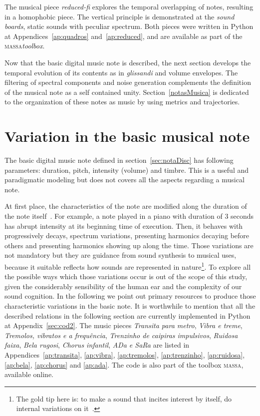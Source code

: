 \documentclass[
 aip,
 jmp,
 amsmath,amssymb,
 reprint,
]{revtex4-1}
\newcommand{\massa}{{\large \textsc{massa}}}
\begin{document}
The musical piece \emph{reduced-fi} explores the temporal overlapping of notes, resulting in a homophobic piece. The vertical principle is demonstrated at the \emph{sound boards}, static sounds with peculiar spectrum. Both pieces were written in Python at Appendices~\ref{ap:quadros} and~\ref{ap:reduced}, and are available as part of the \massa \emph{toolbox}.\cite{MASSA}

Now that the basic digital music note is described, the next section develops the temporal evolution of its contents as in \emph{glissandi} and volume envelopes. The filtering of spectral components and noise generation complements the definition of the musical note as a self contained unity. Section~\ref{notasMusica} is dedicated to the organization of these notes as music by using metrics and trajectories.



\section{Variation in the basic musical note}\label{sec:internalVar}

The basic digital music note defined in section~\ref{sec:notaDisc} has following parameters: duration, pitch, intensity (volume) and timbre. This is a useful and paradigmatic modeling but does not covers all the aspects regarding a musical note.

At first place, the characteristics of the note are modified along the duration of the note itself~\cite{Chowning}. For example, a note played in a piano with duration of 3 seconds has abrupt intensity at its beginning time of execution. Then, it behaves with progressively decays, spectrum variations, presenting harmonics decaying before others and presenting harmonics showing up along the time.
Those variations are not mandatory but they are guidance from sound synthesis to musical uses, because it suitable reflects how sounds are represented in nature\footnote{The gold tip here is: to make a sound that incites interest by itself, do internal variations on it~\cite{Roederer}.}.
To explore all the possible ways which those variations occur is out of the scope of this study, given the considerably sensibility of the human ear and the complexity of our sound cognition. In the following we point out primary resources to produce those characteristic variations in the basic note. It is worthwhile to mention that all the described relations in the following section are currently implemented in Python at Appendix~\ref{sec:cod2}. The music pieces \emph{Transita para metro}, \emph{Vibra e treme}, \emph{Tremolos, vibratos e a frequência}, \emph{Trenzinho de caipiras impulsivos}, \emph{Ruidosa faixa}, \emph{Bela rugosi}, \emph{Chorus infantil}, \emph{ADa e SaRa} are listed in Appendices~\ref{ap:transita}, \ref{ap:vibra}, \ref{ap:tremolos}, \ref{ap:trenzinho}, \ref{ap:ruidosa}, \ref{ap:bela}, \ref{ap:chorus} and \ref{ap:ada}. The code is also part of the toolbox \massa, available online.\cite{MASSA}
 
\end{document}
